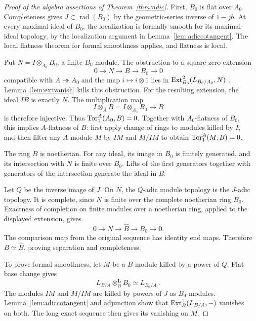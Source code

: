 \documentclass[11pt]{article}
\theoremstyle{definition}\newtheorem{definition}[theorem]{Definition}
\theoremstyle{remark}\newtheorem{remark}[theorem]{Remark}
\begin{document}
\begin{proof}[Proof of the algebra assertions of Theorem~\ref{thm:adic}]
First, $B_0$ is flat over $A_0$. Completeness gives $J\subset\operatorname{rad}(B_0)$ by the geometric-series inverse of $1-jb$. At every maximal ideal of $B_0$, the localization is formally smooth for its maximal-ideal topology, by the localization argument in Lemma~\ref{lem:adiccotangent}. The local flatness theorem for formal smoothness \cite[Tag 07NQ]{Stacks} applies, and flatness is local.

Put $N=I\otimes_{A_0}B_0$, a finite $B_0$-module. The obstruction to a square-zero extension
\[
 0\longrightarrow N\longrightarrow B\longrightarrow B_0\longrightarrow0
\]
compatible with $A\twoheadrightarrow A_0$ and the map $i\mapsto i\otimes1$ lies in $\operatorname{Ext}^2_{B_0}(L_{B_0/A_0},N)$ \cite[Lemma 92.16.1]{Stacks}. Lemma~\ref{lem:extvanish} kills this obstruction. For the resulting extension, the ideal $IB$ is exactly $N$. The multiplication map
\[
 I\otimes_A B=I\otimes_{A_0}B_0\longrightarrow B
\]
is therefore injective. Thus $\operatorname{Tor}_1^A(A_0,B)=0$. Together with $A_0$-flatness of $B_0$, this implies $A$-flatness of $B$: first apply change of rings to modules killed by $I$, and then filter any $A$-module $M$ by $IM$ and $M/IM$ to obtain $\operatorname{Tor}_1^A(M,B)=0$.

The ring $B$ is noetherian. For any ideal, its image in $B_0$ is finitely generated, and its intersection with $N$ is finite over $B_0$. Lifts of the first generators together with generators of the intersection generate the ideal in $B$.

Let $Q$ be the inverse image of $J$. On $N$, the $Q$-adic module topology is the $J$-adic topology. It is complete, since $N$ is finite over the complete noetherian ring $B_0$. Exactness of completion on finite modules over a noetherian ring, applied to the displayed extension, gives
\[
 0\longrightarrow N\longrightarrow\widehat B\longrightarrow B_0\longrightarrow0.
\]
The comparison map from the original sequence has identity end maps. Therefore $B\simeq\widehat B$, proving separation and completeness.

To prove formal smoothness, let $M$ be a $B$-module killed by a power of $Q$. Flat base change gives
\[
 L_{B/A}\otimes_B^{\mathbf L}B_0\simeq L_{B_0/A_0}.
\]
The modules $IM$ and $M/IM$ are killed by powers of $J$ as $B_0$-modules. Lemma~\ref{lem:adiccotangent} and adjunction show that $\operatorname{Ext}_B^1(L_{B/A},-)$ vanishes on both. The long exact sequence then gives its vanishing on $M$.


\end{proof}
\end{document}
